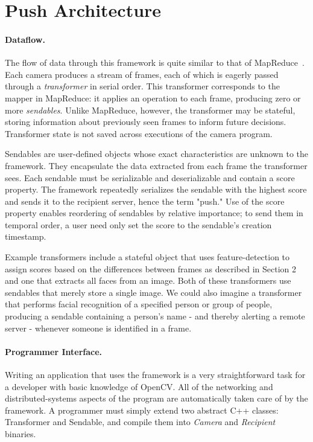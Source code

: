 \section{Push Architecture}

\paragraph{Dataflow.}

The flow of data through this framework is quite similar to that of MapReduce~\cite{mapreduce}.
Each camera produces a stream of frames, each of which is eagerly passed
through a \emph{transformer} in serial order.  This transformer corresponds to
the mapper in MapReduce: it applies an operation to each frame, producing
zero or more \emph{sendables}.  Unlike MapReduce, however, the transformer may be
stateful, storing information about previously seen frames to inform future decisions.
Transformer state is not saved across executions of the camera program.

Sendables are user-defined objects whose exact
characteristics are unknown to the framework.  They encapsulate the data extracted
from each frame the transformer sees.  Each sendable
must be serializable and deserializable and contain a score property.  The
framework repeatedly serializes the sendable with the highest score and sends
it to the recipient server, hence the term "push."  Use of the score property enables reordering of sendables
by relative importance; to send them in temporal order, a user need only set the
score to the sendable's creation timestamp.

Example transformers include a stateful object that uses feature-detection to assign scores
based on the differences between frames as described in Section 2 and
one that extracts all faces from an image.  Both of these transformers use sendables
that merely store a single image.  We could also imagine a transformer that performs facial recognition
of a specified person or group of people, producing a sendable containing a person's name -
and thereby alerting a remote server - whenever someone is identified in a frame.

\paragraph{Programmer Interface.}

Writing an application that uses the framework is a very straightforward
task for a developer with basic knowledge of OpenCV.  All of the
networking and distributed-systems aspects of the program are automatically
taken care of by the framework.  A programmer must simply extend two
abstract C++ classes: Transformer and Sendable, and compile them into
\emph{Camera} and \emph{Recipient} binaries.

